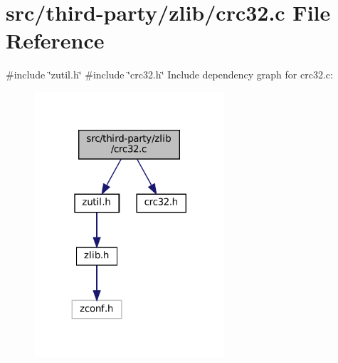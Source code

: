 \hypertarget{third-party_2zlib_2crc32_8c}{}\section{src/third-\/party/zlib/crc32.c File Reference}
\label{third-party_2zlib_2crc32_8c}
{\ttfamily \#include \char`\"{}zutil.\+h\char`\"{}}\newline
{\ttfamily \#include \char`\"{}crc32.\+h\char`\"{}}\newline
Include dependency graph for crc32.\+c\+:
\nopagebreak
\begin{figure}[H]
\begin{center}
\leavevmode
\includegraphics[width=200pt]{third-party_2zlib_2crc32_8c__incl}
\end{center}
\end{figure}

